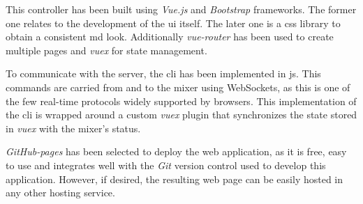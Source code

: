 \documentclass[../main.tex]{subfiles}
\begin{document}
This controller has been built using \textit{Vue.js} and \textit{Bootstrap} frameworks. The former one relates to the development of the \gls{ui} itself. The later one is a \gls{css} library to obtain a consistent \gls{md} look. Additionally \textit{vue-router} has been used to create multiple pages and \textit{vuex} for state management.\newline

To communicate with the server, the \gls{cli} has been implemented in \gls{js}. This commands are carried from and to the mixer using WebSockets, as this is one of the few real-time protocols widely supported by browsers. This implementation of the \gls{cli} is wrapped around a custom \textit{vuex} plugin that synchronizes the state stored in \textit{vuex} with the mixer's status.\newline

\textit{GitHub-pages} has been selected to deploy the web application, as it is free, easy to use and integrates well with the \textit{Git} version control used to develop this application. However, if desired, the resulting web page can be easily hosted in any other hosting service.\newline


\end{document}
